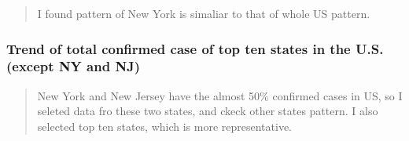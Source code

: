 \documentclass[12pt,]{article}
\newenvironment{Shaded}{\begin{snugshade}}{\end{snugshade}}
\newcommand{\CommentTok}[1]{\textcolor[rgb]{0.56,0.35,0.01}{\textit{#1}}}
\newcommand{\DataTypeTok}[1]{\textcolor[rgb]{0.13,0.29,0.53}{#1}}
\newcommand{\DecValTok}[1]{\textcolor[rgb]{0.00,0.00,0.81}{#1}}
\newcommand{\KeywordTok}[1]{\textcolor[rgb]{0.13,0.29,0.53}{\textbf{#1}}}
\newcommand{\NormalTok}[1]{#1}
\newcommand{\OperatorTok}[1]{\textcolor[rgb]{0.81,0.36,0.00}{\textbf{#1}}}
\newcommand{\StringTok}[1]{\textcolor[rgb]{0.31,0.60,0.02}{#1}}
\begin{document}
\begin{quote}
I found pattern of New York is simaliar to that of whole US pattern.
\end{quote}

\hypertarget{trend-of-total-confirmed-case-of-top-ten-states-in-the-u.s.-except-ny-and-nj}{%
\subsubsection{Trend of total confirmed case of top ten states in the
U.S. (except NY and
NJ)}\label{trend-of-total-confirmed-case-of-top-ten-states-in-the-u.s.-except-ny-and-nj}}

\begin{quote}
New York and New Jersey have the almost 50\% confirmed cases in US, so I
seleted data fro these two states, and ckeck other states pattern. I
also selected top ten states, which is more representative.
\end{quote}

\begin{Shaded}
\end{Shaded}
\end{document}
